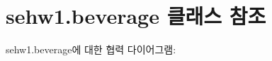 \hypertarget{classsehw1_1_1beverage}{}\section{sehw1.\+beverage 클래스 참조}
\label{classsehw1_1_1beverage}


sehw1.\+beverage에 대한 협력 다이어그램\+:
